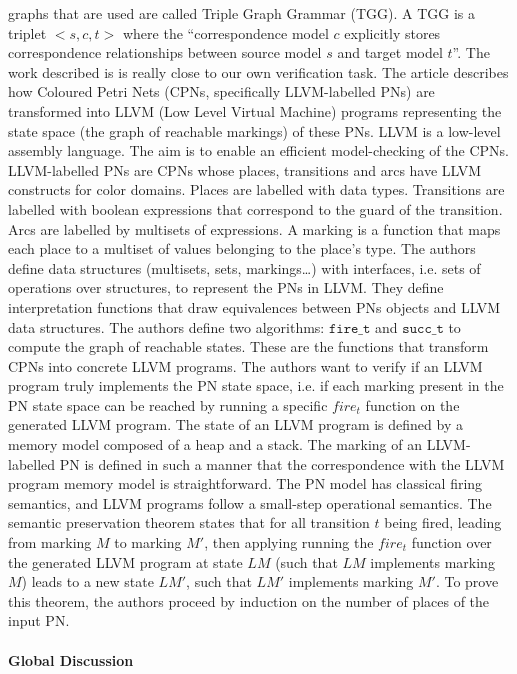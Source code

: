\documentclass[pdflatex,sn-mathphys]{sn-jnl}%
\theoremstyle{thmstyleone}%
\theoremstyle{thmstyletwo}%
\theoremstyle{thmstylethree}%
\begin{document}
graphs that are used are called Triple Graph Grammar (TGG). A TGG is a
triplet ${<}s,c,t{>}$ where the ``correspondence model $c$ explicitly
stores correspondence relationships between source model $s$ and
target model $t$''. The work described is \cite{Fronc2011} is really
close to our own verification task. The article describes how Coloured
Petri Nets (CPNs, specifically LLVM-labelled PNs) are
transformed into LLVM (Low Level Virtual Machine) programs
representing the state space (the graph of reachable markings) of
these PNs. LLVM is a low-level assembly language. The aim is to enable
an efficient model-checking of the CPNs.  LLVM-labelled PNs are CPNs
whose places, transitions and arcs have LLVM constructs for color
domains. Places are labelled with data types.  Transitions are
labelled with boolean expressions that correspond to the guard of the
transition. Arcs are labelled by multisets of expressions. A marking
is a function that maps each place to a multiset of values belonging
to the place's type.  The authors define data structures (multisets,
sets, markings\dots) with interfaces, i.e. sets of operations over
structures, to represent the PNs in LLVM.  They define
interpretation functions that draw equivalences between PNs
objects and LLVM data structures.  The authors define two algorithms:
$\mathtt{fire\_t}$ and $\mathtt{succ\_t}$ to compute the graph of
reachable states.  These are the functions that transform CPNs into
concrete LLVM programs.  The authors want to verify if an LLVM program
truly implements the PN state space, i.e. if each marking present in
the PN state space can be reached by running a specific $fire_t$
function on the generated LLVM program. The state of an LLVM program
is defined by a memory model composed of a heap and a stack. The
marking of an LLVM-labelled PN is defined in such a manner that the
correspondence with the LLVM program memory model is
straightforward. The PN model has classical firing semantics, and LLVM
programs follow a small-step operational semantics. The semantic
preservation theorem states that for all transition $t$ being fired,
leading from marking $M$ to marking $M'$, then applying running the
$fire_t$ function over the generated LLVM program at state $LM$ (such
that $LM$ implements marking $M$) leads to a new state $LM'$, such
that $LM'$ implements marking $M'$. To prove this theorem, the authors
proceed by induction on the number of places of the input PN.


\paragraph{Global Discussion}
\end{document}
